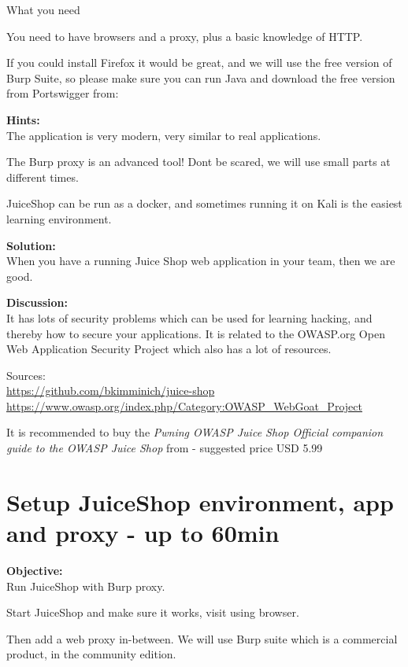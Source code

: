 \documentclass[a4paper,11pt,notitlepage]{report}
\begin{document}
What you need

You need to have browsers and a proxy, plus a basic knowledge of HTTP.

If you could install Firefox it would be great, and we will use the
free version of Burp Suite, so please make sure you can run Java and
download the free version from Portswigger from:



{\bf Hints:}\\
The application is very modern, very similar to real applications.

The Burp proxy is an advanced tool! Dont be scared, we will use small parts at different times.

JuiceShop can be run as a docker, and sometimes running it on Kali is the easiest learning environment.

{\bf Solution:}\\
When you have a running Juice Shop web application in your team, then we are good.

{\bf Discussion:}\\
It has lots of security problems which can be used for learning
hacking, and thereby how to secure your applications. It is  related
to the OWASP.org Open Web Application Security Project which also has a
lot of resources.

Sources:\\
\url{https://github.com/bkimminich/juice-shop}\\
\url{https://www.owasp.org/index.php/Category:OWASP_WebGoat_Project}

It is recommended to buy the \emph{Pwning OWASP Juice Shop Official companion guide to the OWASP Juice Shop} from  - suggested price USD 5.99



\chapter{Setup JuiceShop environment, app and proxy - up to 60min}
\label{ex:js-burp}

{\bf Objective:}\\
Run JuiceShop with Burp proxy.

Start JuiceShop and make sure it works, visit using browser.

Then add a web proxy in-between. We will use Burp suite which is a commercial product, in the community edition.
\end{document}
